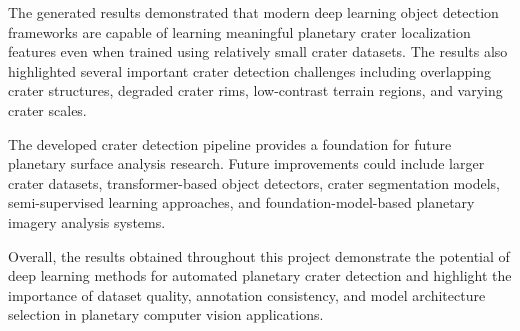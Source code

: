 \documentclass[conference]{IEEEtran}
\begin{document}
	The generated results demonstrated that modern deep learning object detection frameworks are capable of learning meaningful planetary crater localization features even when trained using relatively small crater datasets. The results also highlighted several important crater detection challenges including overlapping crater structures, degraded crater rims, low-contrast terrain regions, and varying crater scales.
	
	The developed crater detection pipeline provides a foundation for future planetary surface analysis research. Future improvements could include larger crater datasets, transformer-based object detectors, crater segmentation models, semi-supervised learning approaches, and foundation-model-based planetary imagery analysis systems.
	
	Overall, the results obtained throughout this project demonstrate the potential of deep learning methods for automated planetary crater detection and highlight the importance of dataset quality, annotation consistency, and model architecture selection in planetary computer vision applications.
	
\end{document}
